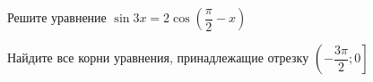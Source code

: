 \begin{ex}
	\begin{condition}
		\begin{enumcols}[label=\asbuk*)]
			\item Решите уравнение \( \sin 3 x = 2 \cos {\left(\dfrac{\pi }{2}- x\right)}\)
			\item Найдите все корни уравнения, принадлежащие отрезку \(  \left(-\dfrac{3\pi}{2};0\right] \)
		\end{enumcols}
	\end{condition}
\end{ex}